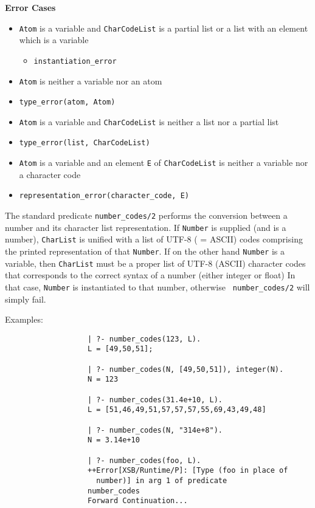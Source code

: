 \begin{description}
{\bf Error Cases}
\begin{itemize}
\item {\tt Atom} is a variable and {\tt CharCodeList} is a partial
  list or a list with an element which is a variable
\begin{itemize}
\item {\tt instantiation\_error}
\end{itemize}
\item {\tt Atom} is neither a variable nor an atom 
\bi
\item {\tt type\_error(atom, Atom)}
\ei
\item {\tt Atom} is a variable and {\tt CharCodeList} is neither a
  list nor a partial list 
\bi
\item {\tt type\_error(list, CharCodeList)}
\ei
\item {\tt Atom} is a variable and an element {\tt E} of {\tt CharCodeList} is neither a
variable nor a character code
\bi
\item {\tt representation\_error(character\_code, E)}
\ei
\end{itemize}

%
    The standard predicate {\tt number\_codes/2} performs the
    conversion between a number and its character list representation.
    If {\tt Number} is supplied (and is a number), {\tt CharList} is
    unified with a list of UTF-8 ( = ASCII) codes comprising the
    printed representation of that {\tt Number}.  If on the other hand
    {\tt Number} is a variable, then {\tt CharList} must be a proper
    list of UTF-8 (ASCII) character codes that corresponds to the
    correct syntax of a number (either integer or float) In that case,
    {\tt Number} is instantiated to that number, otherwise {\tt
      number\_codes/2} will simply fail.

    Examples:
    {\footnotesize
     \begin{verbatim}
                   | ?- number_codes(123, L).
                   L = [49,50,51];

                   | ?- number_codes(N, [49,50,51]), integer(N).
                   N = 123

                   | ?- number_codes(31.4e+10, L).
                   L = [51,46,49,51,57,57,57,55,69,43,49,48]

                   | ?- number_codes(N, "314e+8").
                   N = 3.14e+10

                   | ?- number_codes(foo, L).
                   ++Error[XSB/Runtime/P]: [Type (foo in place of
                     number)] in arg 1 of predicate 
                   number_codes
                   Forward Continuation...
     \end{verbatim}}


\end{description}
